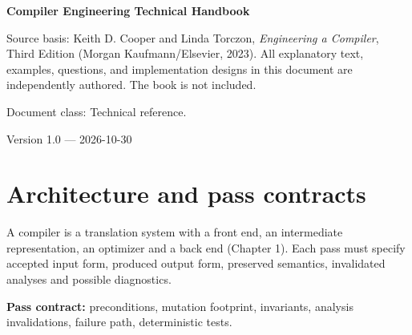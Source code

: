\documentclass[10pt,letterpaper]{article}
\begin{document}
\begin{titlepage}
\centering\vspace*{1.0in}
{\Huge\bfseries\textcolor{CompilerBlue}{Compiler Engineering Technical Handbook}\par}
\vspace{.22in}{\Large Pass boundaries, invariants and implementation decisions\par}
\vspace{.4in}{\large Compiler Engineering Documentation Suite\par}
\vfill
\begin{minipage}{.86\linewidth}\small
Source basis: Keith D. Cooper and Linda Torczon, \emph{Engineering a Compiler}, Third Edition (Morgan Kaufmann/Elsevier, 2023). All explanatory text, examples, questions, and implementation designs in this document are independently authored. The book is not included.\par\medskip
Document class: Technical reference.
\end{minipage}
\vfill\textcolor{CompilerGray}{Version 1.0 --- 2026-10-30}\par
\end{titlepage}
\tableofcontents\clearpage
\section{Architecture and pass contracts}
A compiler is a translation system with a front end, an intermediate representation, an optimizer and a back end (Chapter 1). Each pass must specify accepted input form, produced output form, preserved semantics, invalidated analyses and possible diagnostics.
\begin{center}
\end{center}
\textbf{Pass contract:} preconditions, mutation footprint, invariants, analysis invalidations, failure path, deterministic tests.
\end{document}
